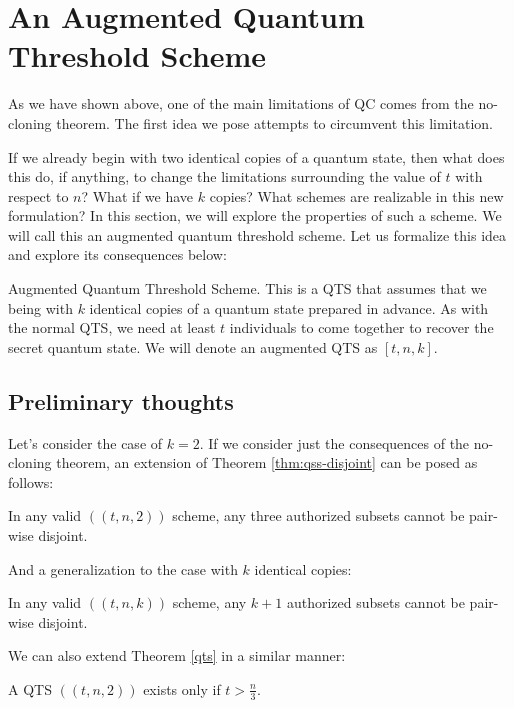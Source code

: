 \chapter{An Augmented Quantum Threshold Scheme}
\label{ch3}

As we have shown above, one of the main limitations of QC comes from the no-cloning theorem. The first idea we pose attempts to circumvent this limitation. 

If we already begin with two identical copies of a quantum state, then what does this do, if anything, to change the limitations surrounding the value of $t$ with respect to $n$? What if we have $k$ copies? What schemes are realizable in this new formulation? In this section, we will explore the properties of such a scheme. We will call this an augmented quantum threshold scheme. Let us formalize this idea and explore its consequences below:

\theoremstyle{definition}
\begin{definition}{Augmented Quantum Threshold Scheme.}
     This is a QTS that assumes that we being with $k$ identical copies of a quantum state prepared in advance. As with the normal QTS, we need at least $t$ individuals to come together to recover the secret quantum state. We will denote an augmented QTS as $[t,n,k]$.
\end{definition}

\section{Preliminary thoughts}

Let's consider the case of $k=2$. If we consider just the consequences of the no-cloning theorem, an extension of Theorem \ref{thm:qss-disjoint} can be posed as follows:

\begin{theorem}
    In any valid $((t,n,2))$ scheme, any three authorized subsets cannot be pair-wise disjoint.
\end{theorem}

And a generalization to the case with $k$ identical copies:

\begin{theorem}
    In any valid $((t,n,k))$ scheme, any $k+1$ authorized subsets cannot be pair-wise disjoint.
\end{theorem}

We can also extend Theorem \ref{qts} in a similar manner:

\begin{theorem}
	\label{qts2}
	A QTS $((t,n, 2))$ exists only if $t > \frac{n}{3}$.
\end{theorem}

